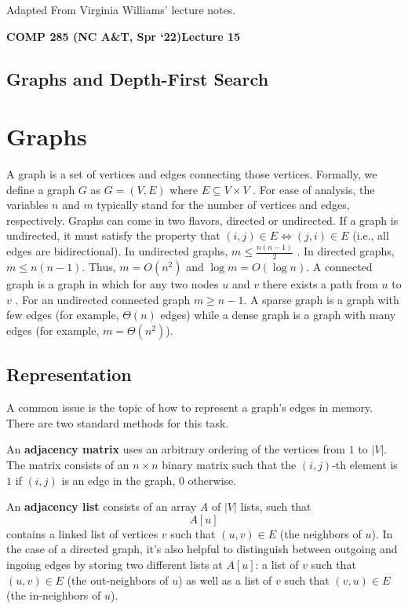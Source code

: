 \documentclass [12pt]{article}
\begin{document}
 

\vspace {1em} 
\begin {Instruction} 
Adapted From Virginia Williams' lecture notes.
\end {Instruction}  

{\LARGE \textbf {COMP 285 (NC A\&T, Spr `22)}\hfill \textbf {Lecture 15} } 

\begin{centering}
\section*{Graphs and Depth-First Search}
\end{centering}

\section{Graphs}
A graph is a set of vertices and edges connecting those vertices. Formally, we define a graph $G$ as $G = (V, E)$ where $E \subseteq V \times V$ . For ease of analysis, the variables $n$ and $m$ typically stand for the number of vertices and edges, respectively. Graphs can come in two flavors, directed or undirected. If a graph is undirected, it must satisfy the property that $(i, j) \in E \iff (j, i) \in E$ (i.e., all edges are bidirectional). In undirected graphs, $m \leq \frac{n(n-1)}{2}$ . In directed graphs, $m \leq n(n - 1)$. Thus, $m = O(n^2)$ and $\log m = O(\log n)$. A connected graph is a graph in which for any two nodes $u$ and $v$ there exists a path from $u$ to $v$ . For an undirected connected graph $m \geq n - 1$. A sparse graph is a graph with few edges (for example, $\Theta(n)$ edges) while a dense graph is a graph with many edges (for example, $m = \Theta(n^2)$).

\subsection{Representation} 

A common issue is the topic of how to represent a graph's edges in memory. There are two standard methods for this task. 

An \textbf{adjacency matrix} uses an arbitrary ordering of the vertices from $1$ to $|V|$. The matrix consists of an $n \times n$ binary matrix such that the $(i, j)$-th element is $1$ if $(i, j)$ is an edge in the graph, $0$ otherwise. 

An \textbf{adjacency list} consists of an array $A$ of $|V |$ lists, such that $$A[u]$$ contains a linked list of vertices $v$ such that $(u, v) \in E$ (the neighbors of $u$). In the case of a directed graph, it's also helpful to distinguish between outgoing and ingoing edges by storing two different lists at $A[u]$: a list of $v$ such that $(u, v ) \in E$ (the out-neighbors of $u$) as well as a list of $v$ such that $(v, u) \in E$ (the in-neighbors of $u$). 
\end{document}
